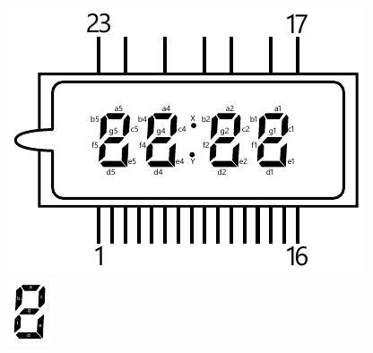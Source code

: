 \documentclass[12pt]{jarticle}
\begin{document}
\begin{figure}[h]
    \begin{minipage}{0.65\linewidth}
        \centering
        \includegraphics[width=\linewidth]{../img/IVL275_mark_EN.pdf}
    \end{minipage}
    \hfill
    \begin{minipage}{0.2\linewidth}
        \centering
        \includegraphics[width=\linewidth]{../img/Segment_EN.pdf}
    \end{minipage}
\end{figure}
\end{document}
